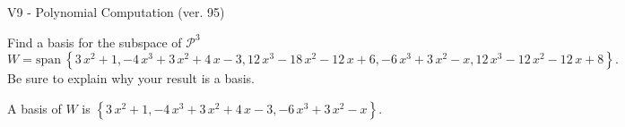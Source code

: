 \begin{exercise}
  \begin{exerciseTitle}V9 - Polynomial Computation (ver. 95)\end{exerciseTitle}
  \begin{exerciseStatement}
    Find a basis for the subspace of \(\mathcal{P}^3\) 
\[W=\mathrm{span}\ \left\{3 \, x^{2} + 1 , -4 \, x^{3} + 3 \, x^{2} + 4 \, x - 3 , 12 \, x^{3} - 18 \, x^{2} - 12 \, x + 6 , -6 \, x^{3} + 3 \, x^{2} - x , 12 \, x^{3} - 12 \, x^{2} - 12 \, x + 8\right\}.\]
 Be sure to explain why your result is a basis.


  \end{exerciseStatement}
  \begin{exerciseAnswer}
   A basis of \(W\) is  \(\left\{3 \, x^{2} + 1 , -4 \, x^{3} + 3 \, x^{2} + 4 \, x - 3 , -6 \, x^{3} + 3 \, x^{2} - x\right\}\).
  


  \end{exerciseAnswer}
\end{exercise}